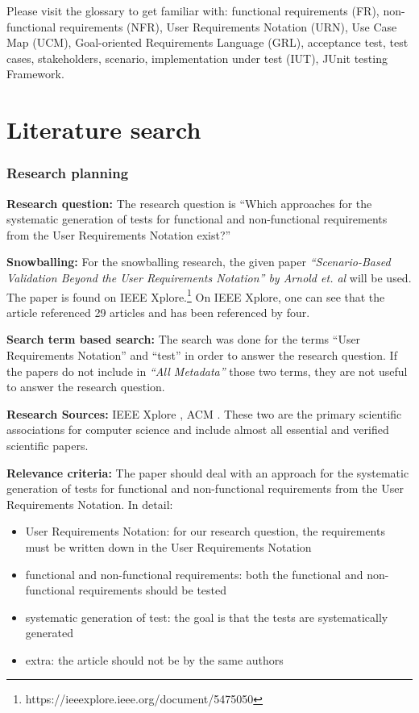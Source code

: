 Please visit the glossary to get familiar with: functional requirements (FR), non-functional requirements (NFR), User Requirements Notation (URN), Use Case Map (UCM), Goal-oriented Requirements Language (GRL), acceptance test, test cases, stakeholders, scenario, implementation under test (IUT), JUnit testing Framework.
\section{Literature search}
\label{topic08:sectionLiteratur}

\subsubsection{Research planning} 

\textbf{Research question:} The research question is \enquote{Which approaches for the systematic generation of tests for functional and non-functional requirements from the User Requirements Notation exist?}

\textbf{Snowballing:} For the snowballing research, the given paper \textit{\enquote{Scenario-Based Validation Beyond the User Requirements Notation} by Arnold et. al} will be used. The paper is found on IEEE Xplore.\footnote{https://ieeexplore.ieee.org/document/5475050} On IEEE Xplore, one can see that the article referenced 29 articles and has been referenced by four. 

\textbf{Search term based search:} The search was done for the terms \enquote{User Requirements Notation} and \enquote{test} in order to answer the research question. If the papers do not include in \textit{\enquote{All Metadata}} those two terms, they are not useful to answer the research question.

\textbf{Research Sources:} IEEE Xplore \cite{ieee}, ACM \cite{acm}. These two are the primary scientific associations for computer science and include almost all essential and verified scientific papers.

\textbf{Relevance criteria:} The paper should deal with an approach for the systematic generation of tests for functional and non-functional requirements from the User Requirements Notation. In detail:
\begin{itemize}
	\itemsep-1em
	\item User Requirements Notation: for our research question, the requirements must be written down in the User Requirements Notation
	\item functional and non-functional requirements: both the functional and non-functional requirements should be tested 
	\item systematic generation of test: the goal is that the tests are systematically generated
	\item extra: the article should not be by the same authors
\end{itemize}

